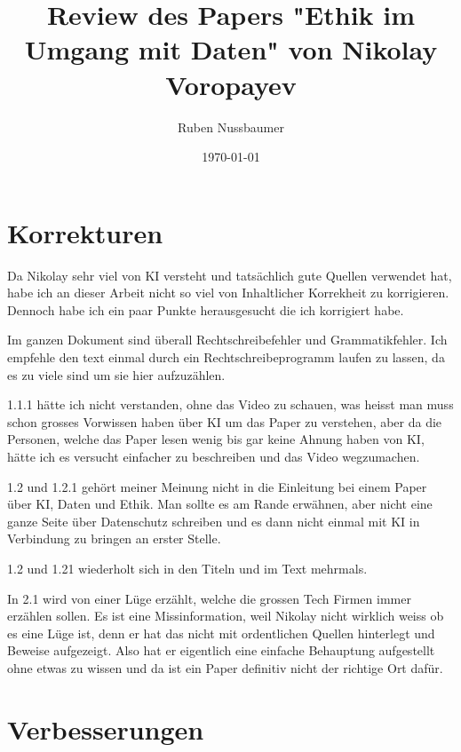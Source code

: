 \documentclass{article}
\title{Review des Papers "Ethik im Umgang mit Daten" von Nikolay Voropayev}
\author{Ruben Nussbaumer}
\date{\today}
\begin{document}
\maketitle


\newpage

\section{Korrekturen}

Da Nikolay sehr viel von KI versteht und tatsächlich gute Quellen verwendet hat, habe ich an dieser Arbeit nicht so viel von Inhaltlicher Korrekheit zu korrigieren. Dennoch habe ich ein paar Punkte herausgesucht die ich korrigiert habe.

Im ganzen Dokument sind überall Rechtschreibefehler und Grammatikfehler. 
Ich empfehle den text einmal durch ein Rechtschreibeprogramm laufen zu lassen, da es zu viele sind um sie hier aufzuzählen.

1.1.1 hätte ich nicht verstanden, ohne das Video zu schauen, was heisst man muss schon grosses Vorwissen haben über KI um das Paper zu verstehen, aber da die Personen, welche das Paper lesen wenig bis gar keine Ahnung haben von KI, hätte ich es versucht einfacher zu beschreiben und das Video wegzumachen.

1.2 und 1.2.1 gehört meiner Meinung nicht in die Einleitung bei einem Paper über KI, Daten und Ethik. Man sollte es am Rande erwähnen, aber nicht eine ganze Seite über Datenschutz schreiben und es dann nicht einmal mit KI in Verbindung zu bringen an erster Stelle.

1.2 und 1.21 wiederholt sich in den Titeln und im Text mehrmals.

In 2.1 wird von einer Lüge erzählt, welche die grossen Tech Firmen immer erzählen sollen. Es ist eine Missinformation, weil Nikolay nicht wirklich weiss ob es eine Lüge ist, denn er hat das nicht mit ordentlichen Quellen hinterlegt und Beweise aufgezeigt. Also hat er eigentlich eine einfache Behauptung aufgestellt ohne etwas zu wissen und da ist ein Paper definitiv nicht der richtige Ort dafür.

\section{Verbesserungen}
\end{document}
